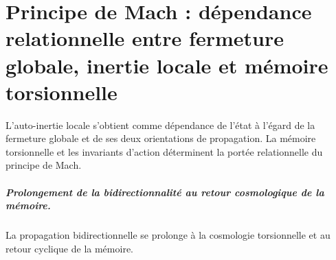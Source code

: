 \chapter{Principe de Mach : dépendance relationnelle entre fermeture globale, inertie locale et mémoire torsionnelle}
\label{chap:parte-iv-70}

L’auto-inertie locale s’obtient comme dépendance de l’état à l’égard de la fermeture globale et de ses deux orientations de propagation. La mémoire torsionnelle et les invariants d’action déterminent la portée relationnelle du principe de Mach.



\paragraph{Prolongement de la bidirectionnalité au retour cosmologique de la mémoire.} La propagation bidirectionnelle se prolonge à la cosmologie torsionnelle et au retour cyclique de la mémoire.
